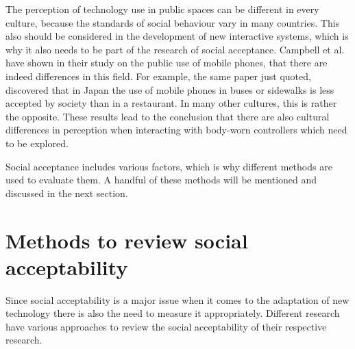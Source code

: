 \documentclass{sigchi}
\begin{document}
The perception of technology use in public spaces can be different in every culture, because the standards of social behaviour vary in many countries. This also should be considered in the development of new interactive systems, which is why it also needs to be part of the research of social acceptance. Campbell et al. \cite{mobile-phones} have shown in their study on the public use of mobile phones, that there are indeed differences in this field. For example, the same paper just quoted, discovered that in Japan the use of mobile phones in buses or sidewalks is less accepted by society than in a restaurant. In many other cultures, this is rather the opposite. \cite{mobile-phones} These results lead to the conclusion that there are also cultural differences in perception when interacting with body-worn controllers which need to be explored.

Social acceptance includes various factors, which is why different methods are used to evaluate them. A handful of these methods will be mentioned and discussed in the next section.

\section{Methods to review social acceptability}
%

Since social acceptability is a major issue when it comes to the adaptation of new technology there is also the need to measure it appropriately. Different research have various approaches to review the social acceptability of their respective research. \cite{touch-wrist}
\end{document}
